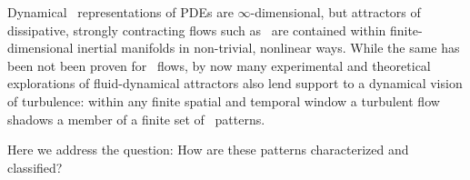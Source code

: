 



Dynamical \statesp\ representations of PDEs are $\infty$-dimensional, but
attractors of dissipative, strongly contracting flows such as \KS\ are
contained within finite-dimensional inertial manifolds%
 in non-trivial, nonlinear ways. While the same has been
not been proven for \NS\ flows, by now many
experimental and theoretical explorations of fluid-dynamical attractors
also lend support to a dynamical vision of turbulence: within any finite spatial
and temporal window a turbulent flow shadows a member of a finite set
of \spt\ patterns.

Here we address the question: How are these
patterns characterized and classified?

